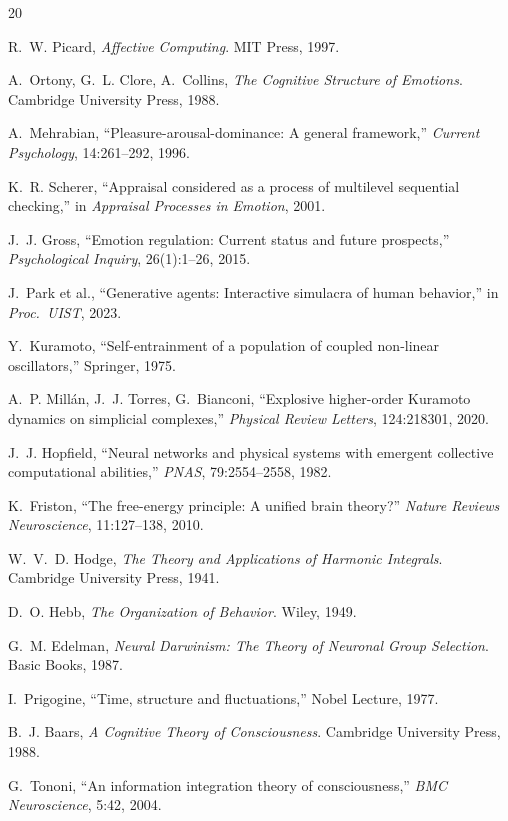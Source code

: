 \documentclass[UTF8,11pt]{ctexart}
\begin{document}
\begin{thebibliography}{20}

R.~W. Picard, \emph{Affective Computing}. MIT Press, 1997.

A.~Ortony, G.~L. Clore, A.~Collins, \emph{The Cognitive Structure of Emotions}. Cambridge University Press, 1988.

A.~Mehrabian, ``Pleasure-arousal-dominance: A general framework,'' \emph{Current Psychology}, 14:261--292, 1996.

K.~R. Scherer, ``Appraisal considered as a process of multilevel sequential checking,'' in \emph{Appraisal Processes in Emotion}, 2001.

J.~J. Gross, ``Emotion regulation: Current status and future prospects,'' \emph{Psychological Inquiry}, 26(1):1--26, 2015.

J.~Park et al., ``Generative agents: Interactive simulacra of human behavior,'' in \emph{Proc.\ UIST}, 2023.

Y.~Kuramoto, ``Self-entrainment of a population of coupled non-linear oscillators,'' Springer, 1975.

A.~P. Mill\'an, J.~J. Torres, G.~Bianconi, ``Explosive higher-order Kuramoto dynamics on simplicial complexes,'' \emph{Physical Review Letters}, 124:218301, 2020.

J.~J. Hopfield, ``Neural networks and physical systems with emergent collective computational abilities,'' \emph{PNAS}, 79:2554--2558, 1982.

K.~Friston, ``The free-energy principle: A unified brain theory?'' \emph{Nature Reviews Neuroscience}, 11:127--138, 2010.

W.~V.~D. Hodge, \emph{The Theory and Applications of Harmonic Integrals}. Cambridge University Press, 1941.

D.~O. Hebb, \emph{The Organization of Behavior}. Wiley, 1949.

G.~M. Edelman, \emph{Neural Darwinism: The Theory of Neuronal Group Selection}. Basic Books, 1987.

I.~Prigogine, ``Time, structure and fluctuations,'' Nobel Lecture, 1977.

B.~J. Baars, \emph{A Cognitive Theory of Consciousness}. Cambridge University Press, 1988.

G.~Tononi, ``An information integration theory of consciousness,'' \emph{BMC Neuroscience}, 5:42, 2004.

\end{thebibliography}
\end{document}
